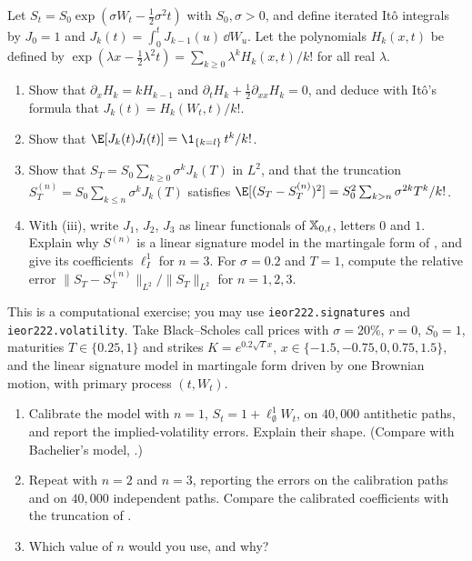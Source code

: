 \begin{exercise}\label{ex:sig-gbm}
\hard Let $S_t=S_0\exp(\sigma W_t-\frac12\sigma^2t)$ with $S_0,\sigma>0$, and define iterated It\^o integrals by
$J_0=1$ and $J_k(t)=\int_0^tJ_{k-1}(u)\,\dd W_u$. Let the polynomials $H_k(x,t)$ be defined by
$\exp(\lambda x-\frac12\lambda^2t)=\sum_{k\ge0}\lambda^kH_k(x,t)/k!$ for all real $\lambda$.
\begin{enumerate}[label=(\alph*)]
  \item Show that $\partial_xH_k=kH_{k-1}$ and $\partial_tH_k+\frac12\partial_{xx}H_k=0$, and deduce with It\^o's
    formula that $J_k(t)=H_k(W_t,t)/k!$.
  \item Show that $\E[J_k(t)J_l(t)]=\1_{\{k=l\}}\,t^k/k!$.
  \item Show that $S_T=S_0\sum_{k\ge0}\sigma^kJ_k(T)$ in $L^2$, and that the truncation
    $S^{(n)}_T=S_0\sum_{k\le n}\sigma^kJ_k(T)$ satisfies $\E[(S_T-S^{(n)}_T)^2]=S_0^2\sum_{k>n}\sigma^{2k}T^k/k!$.
  \item With (iii), write $J_1$, $J_2$, $J_3$ as linear functionals of
    $\mathbb X_{0,t}$, letters $0$ and $1$. Explain why $S^{(n)}$ is a linear signature model in the martingale form of
    , and give its coefficients $\ell^1_I$ for $n=3$. For $\sigma=0.2$ and $T=1$, compute
    the relative error $\|S_T-S^{(n)}_T\|_{L^2}/\|S_T\|_{L^2}$ for $n=1,2,3$.
\end{enumerate}
\end{exercise}

\begin{exercise}\label{ex:sig-flat-smile}
\medium This is a computational exercise; you may use \texttt{ieor222.signatures} and
\texttt{ieor222.volatility}. Take Black--Scholes call prices with $\sigma=20\%$, $r=0$, $S_0=1$, maturities
$T\in\{0.25,1\}$ and strikes $K=e^{0.2\sqrt T x}$, $x\in\{-1.5,-0.75,0,0.75,1.5\}$, and the linear signature model in
martingale form driven by one Brownian motion, with primary process $(t,W_t)$.
\begin{enumerate}[label=(\alph*)]
  \item Calibrate the model with $n=1$, $S_t=1+\ell^1_\emptyset W_t$, on $40{,}000$ antithetic paths, and report the
    implied-volatility errors. Explain their shape. (Compare with Bachelier's model, .)
  \item Repeat with $n=2$ and $n=3$, reporting the errors on the calibration paths and on $40{,}000$ independent
    paths. Compare the calibrated coefficients with the truncation of .
  \item Which value of $n$ would you use, and why?
\end{enumerate}
\end{exercise}
